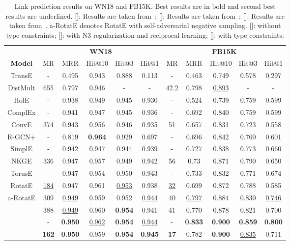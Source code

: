 \documentclass{article}
\begin{document}
\begin{table}[t]
\small
\centering
\caption{Link prediction results on WN18 and FB15K. Best results are in bold and second best results are underlined. []: Results are taken from~\citep{nickel2016holographic}; []: Results are taken from~\citep{kadlec2017knowledge}; []: Results are taken from~\citep{sun2019rotate}. a-RotatE denotes RotatE with self-adversarial negative sampling. []: without type constraints; []: with N3 regularization and reciprocal learning; []: with type constraints.}
\begin{tabular}{ccccccccccc}
\toprule
               & \multicolumn{5}{c}{\textbf{WN18}}   & \multicolumn{5}{c}{\textbf{FB15K}} \\
\textbf{Model} & MR  & MRR   & Hit@10 & Hit@3 & Hit@1 & MR & MRR   & Hit@10 & Hit@3 & Hit@1 \\
              \midrule
TransE        & -   & 0.495 & 0.943  & 0.888 & 0.113 & -  & 0.463 & 0.749  & 0.578 & 0.297 \\
DistMult      &655 & 0.797 & 0.946     & -    & -  & 42.2 & 0.798 & \underline{0.893}  & - & - \\
HolE           & -   & 0.938 & 0.949  & 0.945 & 0.930 & -  & 0.524 & 0.739  & 0.759 & 0.599 \\
ComplEx       & -   & 0.941 & 0.947  & 0.945 & 0.936 & -  &0.692 & 0.840  &0.759 & 0.599\\
ConvE          & 374 & 0.943 & 0.956  & 0.946 & 0.935 & 51 & 0.657 & 0.831  & 0.723 & 0.558 \\
R-GCN+         & - & 0.819 &\textbf{ 0.964 }& 0.929 & 0.697 & - & 0.696 &  0.842 & 0.760 & 0.601 \\
SimplE & - & 0.942 & 0.947 & 0.944 & 0.939 & - & 0.727 & 0.838 & 0.773 & 0.660 \\
NKGE &  336 & 0.947  & 0.957   & 0.949& 0.942  & 56  & 0.73  &  0.871 & 0.790  & 0.650\\
TorusE &-&0.947&0.954&0.950& 0.943& - & 0.733 &0.832& 0.771& 0.674 \\
RotatE         & \underline{184} &  0.947 & 0.961 &  \underline{0.953} & 0.938 & \underline{32} & 0.699 & 0.872  & 0.788 &  0.585 \\

a-RotatE         & 309 &  \underline{0.949} & 0.959 &  0.952 & \underline{0.944} & 40 & \underline{0.797} & 0.884  & 0.830 & \underline{ 0.746 }\\ \midrule
 & 388 &\underline{0.949}& 0.960  & \textbf{0.954} & 0.941  & 41 &0.770 & 0.878 & 0.821 & 0.700 \\
 & - &\textbf{ 0.950} & \underline{0.962}  & \textbf{0.954} & \underline{0.944} & - & \textbf{0.833} &\textbf{0.900} & \textbf{0.859} & \textbf{0.800} \\
 &   \textbf{162} &  \textbf{ 0.950}  &     0.959   & \textbf{0.954}     &   \textbf{0.945}    &  \textbf{17}  &     0.782  &   \textbf{0.900}    &  \underline{0.835}   &    0.711    \\ \bottomrule
\end{tabular}
\vspace{-1em}
\label{table:old}
\end{table}
\end{document}

